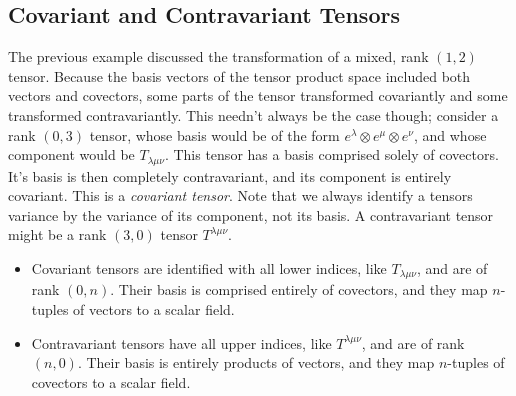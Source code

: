 \subsection{Covariant and Contravariant Tensors}
The previous example discussed the transformation of a mixed, rank $(1,2)$ tensor.
Because the basis vectors of the tensor product space included both vectors and covectors, some parts of the tensor transformed covariantly and some transformed contravariantly.
This needn't always be the case though; consider a rank $(0,3)$ tensor, whose basis would be of the form $e^\lambda \otimes e^\mu \otimes e^\nu$, and whose component would be $T_{\lambda\mu\nu}$.
This tensor has a basis comprised solely of covectors.
It's basis is then completely contravariant, and its component is entirely covariant.
This is a \emph{covariant tensor}.
Note that we always identify a tensors variance by the variance of its component, not its basis.
A contravariant tensor might be a rank $(3,0)$ tensor $T^{\lambda\mu\nu}$.
\begin{itemize}
    \item Covariant tensors are identified with all lower indices, like $T_{\lambda\mu\nu}$, and are of rank $(0,n)$. Their basis is comprised entirely of covectors, and they map $n$-tuples of vectors to a scalar field.
    \item Contravariant tensors have all upper indices, like $T^{\lambda\mu\nu}$, and are of rank $(n,0)$. Their basis is entirely products of vectors, and they map $n$-tuples of covectors to a scalar field.
\end{itemize}
